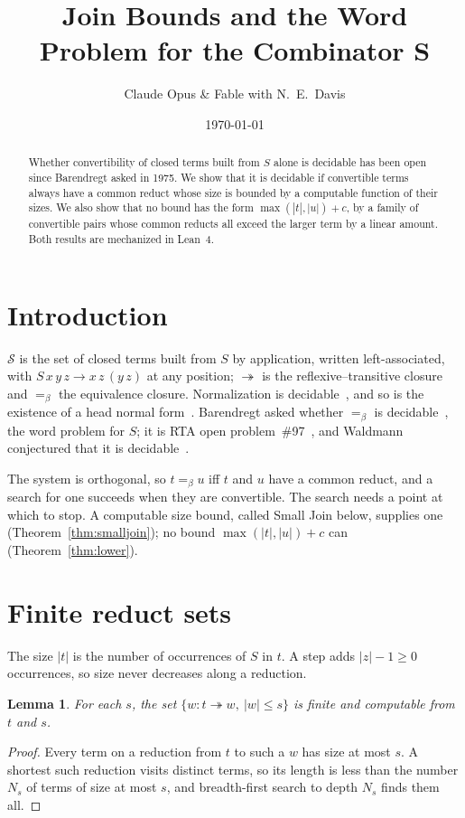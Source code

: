 \documentclass[11pt]{amsart}
\title{Join Bounds and the Word Problem for the Combinator $\bm{S}$}
\author{Claude Opus \& Fable with N.\ E.\ Davis}
\date{\today}
\newtheorem{lemma}[theorem]{Lemma}
\theoremstyle{definition}
\newcommand{\Ter}{\mathcal S}
\newcommand{\conv}{=_{\beta}}
\newcommand{\sz}[1]{|#1|}
\begin{document}
\begin{abstract}
Whether convertibility of closed terms built from $S$ alone is decidable has been open since
Barendregt asked in 1975. We show that it is decidable if convertible terms always have a common
reduct whose size is bounded by a computable function of their sizes. We also show that no bound
has the form $\max(\sz t,\sz u)+c$, by a family of convertible pairs whose common reducts all exceed
the larger term by a linear amount. Both results are mechanized in Lean~4.
\end{abstract}

\maketitle

\section{Introduction}

$\Ter$ is the set of closed terms built from $S$ by application, written left-associated, with
$S\,x\,y\,z\to x\,z\,(y\,z)$ at any position; $\twoheadrightarrow$ is the reflexive--transitive
closure and $\conv$ the equivalence closure. Normalization is
decidable~\citep{waldmann-rta98,waldmann-ic}, and so is the existence of a head normal
form~\citep{s1}. Barendregt asked whether $\conv$ is decidable~\citep{barendregt-open}, the word
problem for $S$; it is RTA open problem~\#97~\citep{rtaloop97}, and Waldmann conjectured that it is
decidable~\citep[\S5]{waldmann-ic}.

The system is orthogonal, so $t\conv u$ iff $t$ and $u$ have a common reduct, and a search for one
succeeds when they are convertible. The search needs a point at which to stop. A computable size
bound, called Small Join below, supplies one (Theorem~\ref{thm:smalljoin}); no bound
$\max(\sz t,\sz u)+c$ can (Theorem~\ref{thm:lower}).

\section{Finite reduct sets}

The size $\sz t$ is the number of occurrences of $S$ in $t$. A step adds $\sz z-1\ge0$ occurrences,
so size never decreases along a reduction.

\begin{lemma}\label{lem:monotone}
For each $s$, the set $\{w : t\twoheadrightarrow w,\ \sz w\le s\}$ is finite and computable from $t$
and $s$.
\end{lemma}
\begin{proof}
Every term on a reduction from $t$ to such a $w$ has size at most $s$. A shortest such reduction
visits distinct terms, so its length is less than the number $N_s$ of terms of size at most $s$,
and breadth-first search to depth $N_s$ finds them all.
\end{proof}
\end{document}
